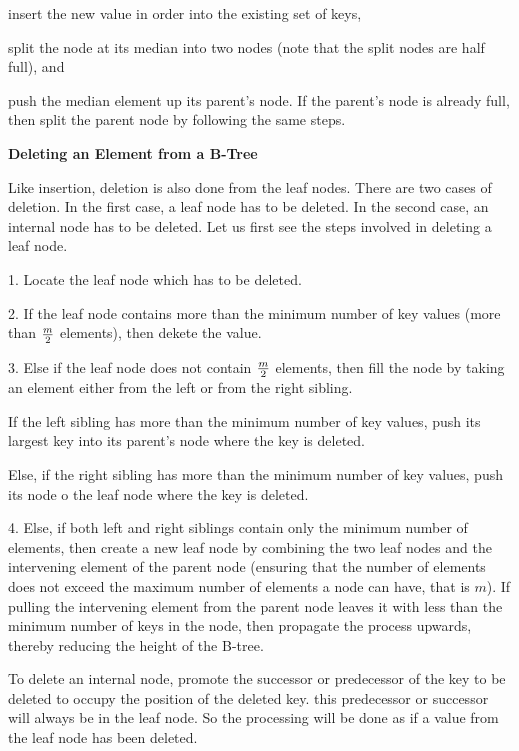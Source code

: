 \vskip 1mm
 insert the new value in order into the existing set of keys,

\vskip 2mm
 split the node at its median into two nodes (note that the split nodes are half full), and 

\vskip 2mm
 push the median element up its parent's node. If the parent's node is already full, then split the parent node by following the same steps.

\filbreak
\vskip 1cm
{\bf Deleting an Element from a B-Tree}

\vskip 1mm
Like insertion, deletion is also done from the leaf nodes. There are two cases of deletion. In the first case, a leaf node has to be deleted. In the second case, an internal node has to be deleted. Let us first see the steps involved in deleting a leaf node.

\vskip 1mm
1. Locate the leaf node which has to be deleted.

\vskip 3mm
2. If the leaf node contains more than the minimum number of key values (more than ${m\over 2}$ elements), then dekete the value.

\vskip 3mm
3. Else if the leaf node does not contain ${m\over 2}$ elements, then fill the node by taking an element either from the left or from the right sibling.

\vskip 2mm
 If the left sibling has more than the minimum number of key values, push its largest key into its parent's node where the key is deleted.

\vskip 2mm
 Else, if the right sibling has more than the minimum number of key values, push its node o the leaf node where the key is deleted.

\vskip 3mm
4. Else, if both left and right siblings contain only the minimum number of elements, then create a new leaf node by combining the two leaf nodes and the intervening element of the parent node (ensuring that the number of elements does not exceed the maximum number of elements a node can have, that is $m$). If pulling the intervening element from the parent node leaves it with less than the minimum number of keys in the node, then propagate the process upwards, thereby reducing the height of the B-tree.

\vskip 1mm
To delete an internal node, promote the successor or predecessor of the key to be deleted to occupy the position of the deleted key. this predecessor or successor will always be in the leaf node. So the processing will be done as if a value from the leaf node has been deleted.

